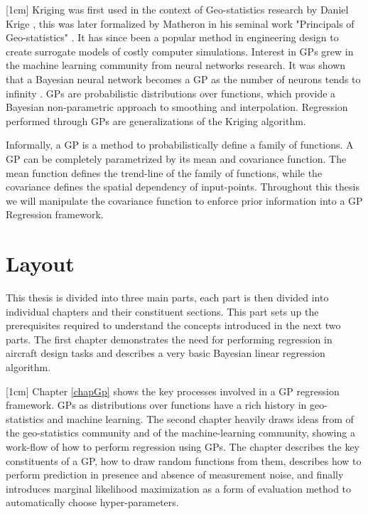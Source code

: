 [1cm]
Kriging was first used in the context of Geo-statistics research by Daniel Krige \cite{krige1951statistical}, this was later formalized by Matheron in his seminal work "Principals of Geo-statistics" \cite{matheron1963principles}. It has since been a popular method in engineering design to create surrogate models of costly computer simulations. Interest in GPs grew in the machine learning community from neural networks research. It was shown that a Bayesian neural network becomes a GP as the number of neurons tends to infinity \cite{neal2012bayesian}. GPs are probabilistic distributions over functions, which provide a Bayesian non-parametric approach to smoothing and interpolation. Regression performed through GPs are generalizations of the Kriging algorithm. 

Informally, a GP is a method to probabilistically define a family of functions. A GP can be completely parametrized by its mean and covariance function. The mean function defines the trend-line of the family of functions, while the covariance defines the spatial dependency of input-points. Throughout this thesis we will manipulate the covariance function to enforce prior information into a GP Regression framework. 

\section{Layout}\label{secOutline}
This thesis is divided into three main parts, each part is then divided into individual chapters and their constituent sections. This part sets up the prerequisites required to understand the concepts introduced in the next two parts. The first chapter demonstrates the need for performing regression in aircraft design tasks and describes a very basic Bayesian linear regression algorithm. 

[1cm]
Chapter \ref{chapGp} shows the key processes involved in a GP regression framework. GPs as distributions over functions have a rich history in geo-statistics and machine learning. The second chapter heavily draws ideas from \cite{krige1951statistical, matheron1963principles} of the geo-statistics community and \cite{Stein1999Springer, kennedy2000predicting, Rasmussen2005, mackay2003information} of the machine-learning community, showing a work-flow of how to perform regression using GPs. The chapter describes the key constituents of a GP, how to draw random functions from them, describes how to perform prediction in presence and absence of measurement noise, and finally introduces marginal likelihood maximization as a form of evaluation method to automatically choose hyper-parameters. 


